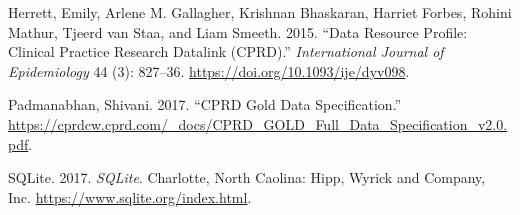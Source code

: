 \documentclass[
]{article}
\newlength{\cslhangindent}
\newlength{\cslentryspacingunit} %
\newenvironment{CSLReferences}[2] %
 {%
  \setlength{\parindent}{0pt}
  \ifodd #1
  \let\oldpar\par
  \def\par{\hangindent=\cslhangindent\oldpar}
  \fi
  \setlength{\parskip}{#2\cslentryspacingunit}
 }%
 {}
\begin{document}
\hypertarget{refs}{}
\begin{CSLReferences}{1}{0}
\leavevmode{}%
Herrett, Emily, Arlene M. Gallagher, Krishnan Bhaskaran, Harriet Forbes,
Rohini Mathur, Tjeerd van Staa, and Liam Smeeth. 2015. {``Data
{R}esource {P}rofile: {C}linical {P}ractice {R}esearch {D}atalink
({CPRD}).''} \emph{International {J}ournal of {E}pidemiology} 44 (3):
827--36. \url{https://doi.org/10.1093/ije/dyv098}.

\leavevmode{}%
Padmanabhan, Shivani. 2017. {``{CPRD} {G}old {D}ata {S}pecification.''}
\url{https://cprdcw.cprd.com/_docs/CPRD_GOLD_Full_Data_Specification_v2.0.pdf}.

\leavevmode{}%
SQLite. 2017. \emph{S{QL}ite}. Charlotte, {N}orth {C}aolina: {Hipp,
{W}yrick and {C}ompany, {I}nc}. \url{https://www.sqlite.org/index.html}.

\end{CSLReferences}
\end{document}
